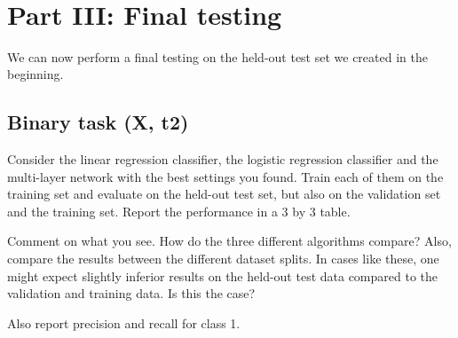 \documentclass[a4paper,landscape]{article}
\begin{document}
    \begin{center}
    \end{center}
    { \hspace*{\fill} \\}
    
    \section{Part III: Final testing}\label{part-iii-final-testing}

We can now perform a final testing on the held-out test set we created
in the beginning.

\subsection{Binary task (X, t2)}\label{binary-task-x-t2}

Consider the linear regression classifier, the logistic regression
classifier and the multi-layer network with the best settings you found.
Train each of them on the training set and evaluate on the held-out test
set, but also on the validation set and the training set. Report the
performance in a 3 by 3 table.

Comment on what you see. How do the three different algorithms compare?
Also, compare the results between the different dataset splits. In cases
like these, one might expect slightly inferior results on the held-out
test data compared to the validation and training data. Is this the
case?

Also report precision and recall for class 1.
\end{document}
